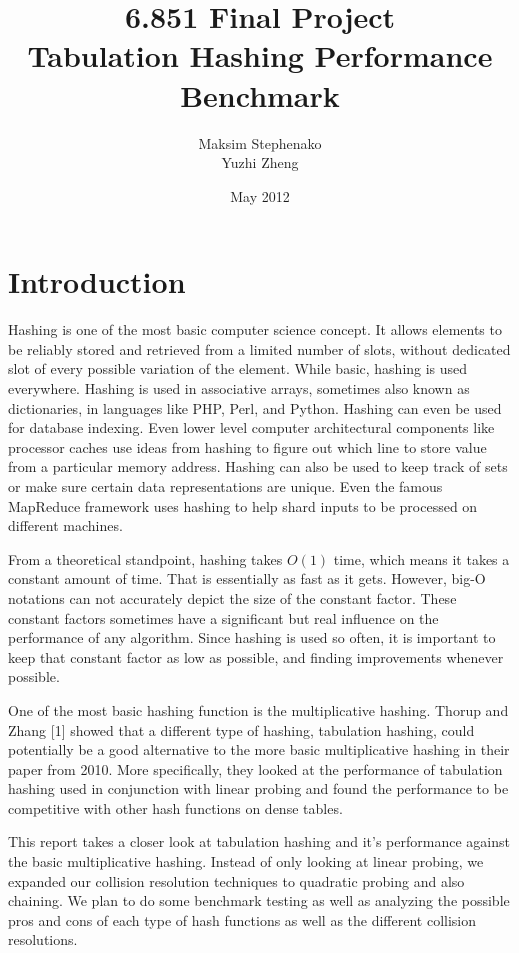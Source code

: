 \documentclass[11pt]{article}
\title{6.851 Final Project \\ Tabulation Hashing Performance Benchmark}
\author{Maksim Stephenako \\ Yuzhi Zheng}
\date{May 2012}
\begin{document}
\setlength{\baselineskip}{1.15\baselineskip}

\ifpdf
{}
\else
{}
\fi

\maketitle

\section{Introduction}
Hashing is one of the most basic computer science concept. 
It allows elements to be reliably stored and 
retrieved from a limited number of slots, without dedicated slot of every possible 
variation of the element. While basic, hashing is used everywhere. Hashing is used in 
associative arrays, sometimes also known as dictionaries, in languages like 
PHP, Perl, and Python. Hashing can even be used for database indexing. 
Even lower level computer architectural components like processor caches 
use ideas from hashing to figure out which line to store value from a particular
memory address. Hashing can also be used to keep track of sets or make 
sure certain data representations are unique. Even the famous MapReduce
framework uses hashing to help shard inputs to be processed on different machines.

From a theoretical standpoint, hashing takes $O(1)$ time, which means it takes a constant
amount of time. That is essentially as fast as it gets. However, big-O notations can not
accurately depict the size of the constant factor. These constant factors sometimes
have a significant but real influence on the performance of any algorithm. 
Since hashing is used so often, it is important to keep that constant factor
as low as possible, and finding improvements whenever possible.

One of the most basic hashing function is the multiplicative hashing. 
Thorup and Zhang [1] showed that a different type of hashing, tabulation hashing,
could potentially be a good alternative to the more basic multiplicative hashing 
in their paper from 2010. More specifically, they looked at the performance of tabulation hashing
used in conjunction with linear probing and found the performance to be competitive with
other hash functions on dense tables.

This report takes a closer look at tabulation hashing and it's performance 
against the basic multiplicative hashing. Instead of only looking at linear 
probing, we expanded our collision resolution techniques to quadratic probing 
and also chaining. We plan to do some benchmark testing as well as  
analyzing the possible pros and cons of each type of hash functions as 
well as the different collision resolutions.
\end{document}
